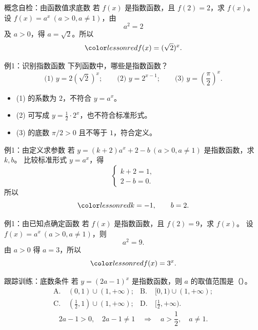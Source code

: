 \documentclass[aspectratio=169,10pt]{beamer}
\begin{document}
\begin{frame}[t]{概念自检：由函数值求底数}
 若 $f(x)$ 是指数函数，且 $f(2)=2$，求 $f(x)$。
 \pause
 设 $f(x)=a^x\ (a>0,a\ne1)$，由
 \[a^2=2\]
 及 $a>0$，得 $a=\sqrt2$。所以
 \[\ans{f(x)=(\sqrt2)^x}.\]
\end{frame}

\begin{frame}[t]{例1：识别指数函数}
 下列函数中，哪些是指数函数？
 \[\text{(1) }y=2(\sqrt2)^x;\qquad
   \text{(2) }y=2^{x-1};\qquad
   \text{(3) }y=\left(\frac\pi2\right)^x.\]
 \pause
 \begin{itemize}
  \item (1) 的系数为 $2$，不符合 $y=a^x$。
  \item (2) 可写成 $y=\frac12\cdot2^x$，也不符合标准形式。
  \item (3) 的底数 $\pi/2>0$ 且不等于 $1$，符合定义。
 \end{itemize}
\end{frame}

\begin{frame}[t]{例1：由定义求参数}
 若 $y=(k+2)a^x+2-b\ (a>0,a\ne1)$ 是指数函数，求 $k,b$。
 \pause
 比较标准形式 $y=a^x$，得
 \[\begin{cases}k+2=1,\\2-b=0.\end{cases}\]
 所以
 \[\ans{k=-1,\qquad b=2}.\]
\end{frame}

\begin{frame}[t]{例1：由已知点确定函数}
 若 $f(x)$ 是指数函数，且 $f(2)=9$，求 $f(x)$。
 \pause
 设 $f(x)=a^x\ (a>0,a\ne1)$，则
 \[a^2=9.\]
 由 $a>0$ 得 $a=3$，所以
 \[\ans{f(x)=3^x}.\]
\end{frame}

\begin{frame}[t]{跟踪训练：底数条件}
 若 $y=(2a-1)^x$ 是指数函数，则 $a$ 的取值范围是（\quad）。
 \normalsize
 \begin{align*}
  \mathrm A.&\ (0,1)\cup(1,+\infty);&
  \mathrm B.&\ [0,1)\cup(1,+\infty);\\[.5em]
  \mathrm C.&\ (\tfrac12,1)\cup(1,+\infty);&
  \mathrm D.&\ [\tfrac12,+\infty).
 \end{align*}
 \pause
 \[2a-1>0,\quad 2a-1\ne1\quad\Longrightarrow\quad
   a>\frac12,\quad a\ne1.\]
\end{frame}
\end{document}
